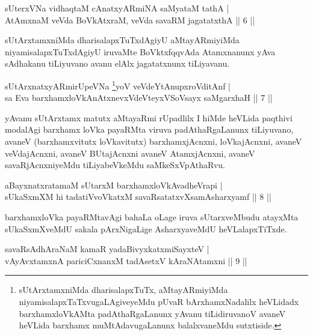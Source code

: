
\begin{shl}
sUterxVNa vidhaqtaM cAnatxyARmiNA saMyataM tathA |\\
AtAmxnaM veVda BoVkAtxraM, veVda savaRM jagatatxthA \hfill || 6 ||
\end{shl}

\begin{artha}
sUtArxtamxniMda dharisalapxTuTxdAgiyU aMtayARmiyiMda niyamisalapxTuTxdAgiyU iruvaMte BoVktxfqqvAda Atamxnanunx yAva sAdhakanu tiLiyuvano avanu elAlx jagatatxnunx tiLiyavanu.
\end{artha}

\begin{shl}
sUtArxnatxyARmirUpeVNa \footnote{sUtArxtamxniMda dharisalapxTuTx, aMtayARmiyiMda niyamisalapxTaTxvugaLAgiveyeMdu pUvaR bArxhamxNadalilx heVLidadx barxhamxloVkAMta padAthaRgaLanunx yAvanu tiLidiruvanoV avaneV heVLida barxhamx muMtAdavugaLanunx balalxvaneMdu sutxtiside.}yoV veVdeYtAnupxroVditAnf |\\
sa Eva barxhamxloVkAnAtxnevxVdeVteyxVSoV\s sayx saMgarxhaH \hfill || 7 ||
\end{shl}

\begin{artha}
yAvanu sUtArxtamx matutx aMtayaRmi rUpadlilx I hiMde heVLida paqthivi modalAgi barxhamx loVka payaRMta viruva padAthaRgaLanunx tiLiyuvano, avaneV (barxhamxvitutx loVkavitutx) barxhamxjAcnxni, loVkajAcnxni, avaneV veVdajAcnxni, avaneV BUtajAcnxni avaneV AtamxjAcnxni, avaneV savaRjAcnxniyeMdu tiLiyabeVkeMdu saMkeSxVpAthaRvu.
\end{artha}

\begin{shl}
aBayxnatxratamaM sUtarxM barxhamxloVkAvadheVrapi |\\
sUkaSxmXM hi tadatiVvoVkatxM savaRsatatxvXsamAsharxyamf \hfill || 8 ||
\end{shl}

\begin{artha}%
barxhamxloVka payaRMtavAgi bahaLa oLage iruva sUtarxveMbudu atayxMta sUkaSxmXveMdU sakala pArxNigaLige AsharxyaveMdU heVLalapxTiTxde.
\end{artha}

\begin{shl}
savaRsAdhAraNaM kamaR yadaBivyxkatxmiSayxteV |\\
vAyAvxtamxnA pariciCxnanxM tadAsetxV kAraNAtamxni \hfill || 9 ||
\end{shl}

